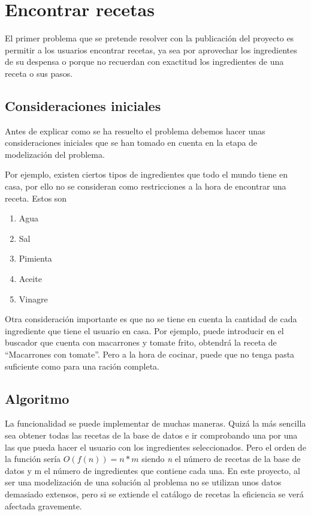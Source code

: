 \newpage
\section{Encontrar recetas}
El primer problema que se pretende resolver con la publicación del proyecto es permitir a los usuarios encontrar recetas, ya sea por aprovechar los ingredientes de su despensa o porque no recuerdan con exactitud los ingredientes de una receta o sus pasos.

\subsection{Consideraciones iniciales}
Antes de explicar como se ha resuelto el problema debemos hacer unas consideraciones iniciales que se han tomado en cuenta en la etapa de modelización del problema.

Por ejemplo, existen ciertos tipos de ingredientes que todo el mundo tiene en casa, por ello no se consideran como restricciones a la hora de encontrar una receta. Estos son
\begin{enumerate}
    \item Agua
    \item Sal
    \item Pimienta
    \item Aceite
    \item Vinagre
\end{enumerate}

Otra consideración importante es que no se tiene en cuenta la cantidad de cada ingrediente que tiene el usuario en casa. Por ejemplo, puede introducir en el buscador que cuenta con macarrones y tomate frito, obtendrá la receta de ``Macarrones con tomate''. Pero a la hora de cocinar, puede que no tenga pasta suficiente como para una ración completa.

\subsection{Algoritmo}
La funcionalidad se puede implementar de muchas maneras. Quizá la más sencilla sea obtener todas las recetas de la base de datos e ir comprobando una por una las que pueda hacer el usuario con los ingredientes seleccionados. Pero el orden de la función sería  $O(f(n))=n*m$ siendo \textit{n} el número de recetas de la base de datos y m el número de ingredientes que contiene cada una. En este proyecto, al ser una modelización de una solución al problema no se utilizan unos datos demasiado extensos, pero si se extiende el catálogo de recetas la eficiencia se verá afectada gravemente.

